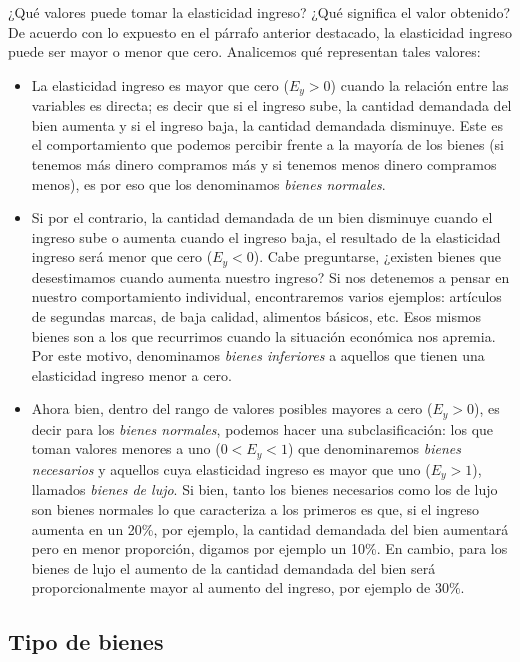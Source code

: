 \documentclass[12pt,a4paper]{article}
\begin{document}
¿Qué valores puede tomar la elasticidad ingreso? ¿Qué significa el valor obtenido? De acuerdo con lo expuesto en el párrafo anterior destacado, la elasticidad ingreso puede ser mayor o menor que cero. Analicemos qué representan tales valores:

\begin{itemize}
\item La elasticidad ingreso es mayor que cero ($E_y > 0$) cuando la relación entre las variables es directa; es decir que si el ingreso sube, la cantidad demandada del bien aumenta y si el ingreso baja, la cantidad demandada disminuye. Este es el comportamiento que podemos percibir frente a la mayoría de los bienes (si tenemos más dinero compramos más y si tenemos menos dinero compramos menos), es por eso que los denominamos \textit{bienes normales}.

\item Si por el contrario, la cantidad demandada de un bien disminuye cuando el ingreso sube o aumenta cuando el ingreso baja, el resultado de la elasticidad ingreso será menor que cero ($E_y < 0$). Cabe preguntarse, ¿existen bienes que desestimamos cuando aumenta nuestro ingreso? Si nos detenemos a pensar en nuestro comportamiento individual, encontraremos varios ejemplos: artículos de segundas marcas, de baja calidad, alimentos básicos, etc. Esos mismos bienes son a los que recurrimos cuando la situación económica nos apremia. Por este motivo, denominamos \textit{bienes inferiores} a aquellos que tienen una elasticidad ingreso menor a cero.

\item Ahora bien, dentro del rango de valores posibles mayores a cero ($E_y > 0$), es decir para los \textit{bienes normales}, podemos hacer una subclasificación: los que toman valores menores a uno ($0 < E_y < 1$) que denominaremos \textit{bienes necesarios} y aquellos cuya elasticidad ingreso es mayor que uno ($E_y > 1$), llamados \textit{bienes de lujo}. Si bien, tanto los bienes necesarios como los de lujo son bienes normales lo que caracteriza a los primeros es que, si el ingreso aumenta en un 20\%, por ejemplo, la cantidad demandada del bien aumentará pero en menor proporción, digamos por ejemplo un 10\%. En cambio, para los bienes de lujo el aumento de la cantidad demandada del bien será proporcionalmente mayor al aumento del ingreso, por ejemplo de 30\%.
\end{itemize}

\subsection{Tipo de bienes}
\end{document}
